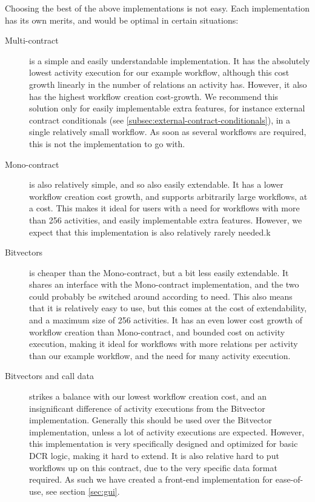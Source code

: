 \documentclass{article}
\begin{document}
	Choosing the best of the above implementations is not easy.
	Each implementation has its own merits, and would be optimal in certain situations:
	\begin{description}
	 	\item[Multi-contract] is a simple and easily understandable implementation. 
	 		It has the absolutely lowest activity execution for our example workflow, although this cost growth linearly in the number of relations an activity has. 
	 		However, it also has the highest workflow creation cost-growth. 
	 		We recommend this solution only for easily implementable extra features, for instance external contract conditionals (see \ref{subsec:external-contract-conditionals}), in a single relatively small workflow.
	 		As soon as several workflows are required, this is not the implementation to go with.
	 	\item[Mono-contract] is also relatively simple, and so also easily extendable.
	 		It has a lower workflow creation cost growth, and supports arbitrarily large workflows, at a cost. 
	 		This makes it ideal for users with a need for workflows with more than 256 activities, and easily implementable extra features.
	 		However, we expect that this implementation is also relatively rarely needed.k
	 	\item[Bitvectors] is cheaper than the Mono-contract, but a bit less easily extendable.
	 		It shares an interface with the Mono-contract implementation, and the two could probably be switched around according to need.
	 		This also means that it is relatively easy to use, but this comes at the cost of extendability, and a maximum size of 256 activities.
	 		It has an even lower cost growth of workflow creation than Mono-contract, and bounded cost on activity execution, making it ideal for workflows with more relations per activity than our example workflow, and the need for many activity execution.
	 	\item[Bitvectors and call data] strikes a balance with our lowest workflow creation cost, and an insignificant difference of activity executions from the Bitvector implementation.
	 	Generally this should be used over the Bitvector implementation, unless a lot of activity executions are expected.
	 	However, this implementation is very specifically designed and optimized for basic DCR logic, making it hard to extend.
	 	It is also relative hard to put workflows up on this contract, due to the very specific data format required. 
	 	As such we have created a front-end implementation for ease-of-use, see section \ref{sec:gui}.
	 \end{description} 
	 
\end{document}
